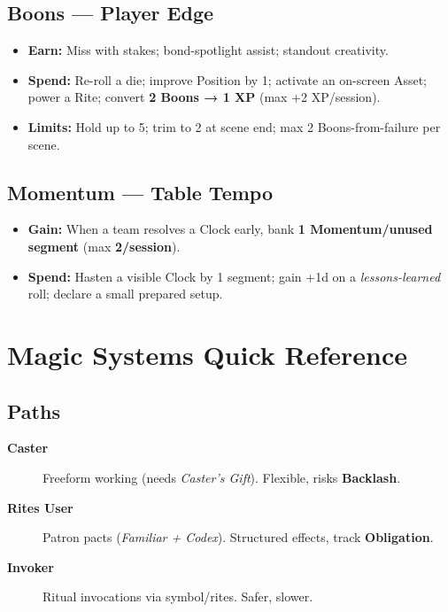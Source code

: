 \begin{multicols}{2}
\subsection*{Boons — Player Edge}
\begin{itemize}
  \item \textbf{Earn:} Miss with stakes; bond-spotlight assist; standout creativity.
  \item \textbf{Spend:} Re-roll a die; improve Position by 1; activate an on-screen Asset; power a Rite; convert \textbf{2 Boons → 1 XP} (max +2 XP/session).
  \item \textbf{Limits:} Hold up to 5; trim to 2 at scene end; max 2 Boons-from-failure per scene.
\end{itemize}

\subsection*{Momentum — Table Tempo}
\begin{itemize}
  \item \textbf{Gain:} When a team resolves a Clock early, bank \textbf{1 Momentum/unused segment} (max \textbf{2/session}).
  \item \textbf{Spend:} Hasten a visible Clock by 1 segment; gain +1d on a \emph{lessons-learned} roll; declare a small prepared setup.
\end{itemize}

\section{Magic Systems Quick Reference}

\subsection*{Paths}
\begin{description}
  \item[\textbf{Caster}] Freeform working (needs \emph{Caster's Gift}). Flexible, risks \textbf{Backlash}.
  \item[\textbf{Rites User}] Patron pacts (\emph{Familiar + Codex}). Structured effects, track \textbf{Obligation}.
  \item[\textbf{Invoker}] Ritual invocations via symbol/rites. Safer, slower.
\end{description}


\end{multicols}
